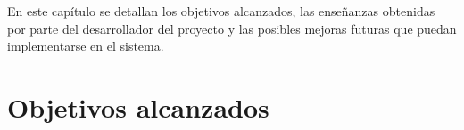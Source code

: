 

En este capítulo se detallan los objetivos alcanzados, las enseñanzas obtenidas por parte del desarrollador del proyecto y las posibles mejoras futuras que puedan implementarse en el sistema.

\section{Objetivos alcanzados}

